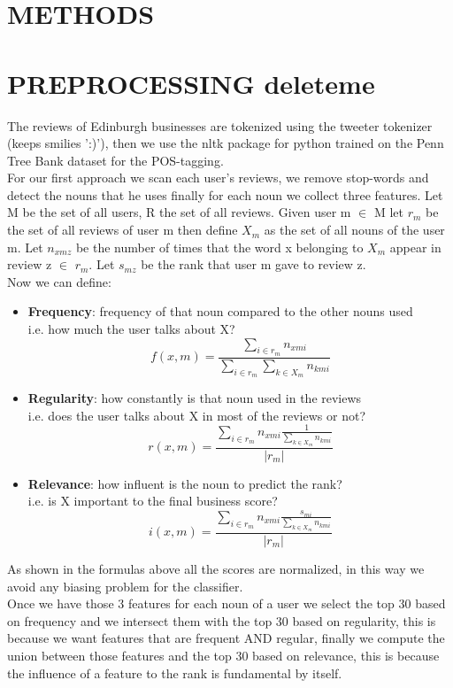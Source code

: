 \documentclass[11pt]{article}
\begin{document}
\section{METHODS}
\section{PREPROCESSING deleteme}
The reviews of Edinburgh businesses are tokenized using the tweeter tokenizer (keeps smilies ':)'), then we use the nltk package for python trained on the  Penn Tree Bank dataset for the POS-tagging.\\
For our first approach we scan each user's reviews, we remove stop-words and detect the nouns that he uses finally for each noun we collect three features.
Let M be the set of all users, R the set of all reviews.
Given user m $\in$ M let $r_m$ be the set of all reviews of user m then define $X_m$ as the set of all nouns of the user m.
Let $n_{xmz}$ be the number of times that the word x belonging to $X_m$ appear in review z $\in$ $r_m.$
Let $s_{mz}$ be the rank that user m gave to review z.\\
Now we can define:
\begin{itemize}
	\item \textbf{Frequency}: frequency of that noun compared to the other nouns used\\
	i.e. how much the user talks about X?
	\[ f(x,m)= \frac{\sum_{i \in r_m}n_{xmi}}{\sum_{i \in r_m}\sum_{k \in X_m} n_{kmi}} \]
	\item \textbf{Regularity}: how constantly is that noun used in the reviews\\
	i.e. does the user talks about X in most of the reviews or not?
	\[ r(x,m)= \frac{\sum_{i \in r_m}
		n_{xmi}  \frac{1}{\sum_{k \in X_m}n_{kmi}}}	
	{|r_m|} \]
	\item \textbf{Relevance}: how influent is the noun to predict the rank?\\
	i.e. is X important to the final business score?
	\[ i(x,m)= \frac{\sum_{i \in r_m}
		n_{xmi}  \frac{s_{mi}}{\sum_{k \in X_m}n_{kmi}}}	
	{|r_m|} \]
\end{itemize}
As shown in the formulas above all the scores are normalized, in this way we avoid any biasing problem for the classifier.\\
Once we have those 3 features for each noun of a user we select the top 30 based on frequency and we intersect them with the top 30 based on regularity, this is because we want features that are frequent AND regular, finally we compute the union between those features and the top 30 based on relevance, this is because the influence of a feature to the rank is fundamental by itself. 
\end{document}
